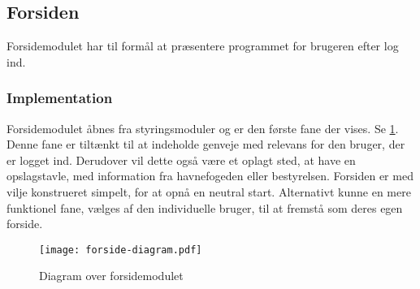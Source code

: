 \subsection{Forsiden}
\label{sub:Welcome}

Forsidemodulet har til formål at præsentere programmet for brugeren efter log ind.

\subsubsection{Implementation}
\label{ssub:Welcome_implementation}
Forsidemodulet åbnes fra styringsmoduler og er den første fane der vises. Se \cref{fig:forsidemod}. Denne fane er tiltænkt til at indeholde genveje med relevans for den bruger, der er logget ind. Derudover vil dette også være et oplagt sted, at have en opslagstavle, med  information fra havnefogeden eller bestyrelsen. Forsiden er med vilje konstrueret simpelt, for at opnå en neutral start. Alternativt kunne en mere funktionel fane, vælges af den individuelle bruger, til at fremstå som deres egen forside.


\begin{figure}
  \centering
  \texttt{[image: forside-diagram.pdf]}
  \caption{Diagram over forsidemodulet} \label{fig:forsidemod}
\end{figure}
